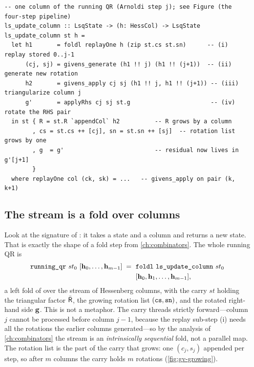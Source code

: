 \begin{lstlisting}[style=l4style]
-- one column of the running QR (Arnoldi step j); see Figure (the four-step pipeline)
ls_update_column :: LsqState -> (h: HessCol) -> LsqState
ls_update_column st h =
  let h1       = foldl replayOne h (zip st.cs st.sn)      -- (i) replay stored 0..j-1
      (cj, sj) = givens_generate (h1 !! j) (h1 !! (j+1))  -- (ii) generate new rotation
      h2       = givens_apply cj sj (h1 !! j, h1 !! (j+1)) -- (iii) triangularize column j
      g'       = applyRhs cj sj st.g                       -- (iv) rotate the RHS pair
  in st { R = st.R `appendCol` h2          -- R grows by a column
        , cs = st.cs ++ [cj], sn = st.sn ++ [sj]  -- rotation list grows by one
        , g  = g'                          -- residual now lives in g'[j+1]
        }
  where replayOne col (ck, sk) = ...   -- givens_apply on pair (k, k+1)
\end{lstlisting}

\subsection{The stream is a fold over columns}
\label{sec:gv-fold}

Look at the signature of : it takes a state and a column and
returns a new state. That is exactly the shape of a fold step from \cref{ch:combinators}.
The whole running QR is
\begin{equation}
\label{eq:gv-fold}
\begin{aligned}
  \texttt{running\_qr}\ st_0\ [\mathbf{h}_0, \dots, \mathbf{h}_{m-1}]
  \;=\;\ &\texttt{foldl}\ \texttt{ls\_update\_column}\ st_0\\
  &[\mathbf{h}_0, \mathbf{h}_1, \dots, \mathbf{h}_{m-1}],
\end{aligned}
\end{equation}
a left fold of  over the stream of Hessenberg columns, with the
carry $st$ holding the triangular factor $\bar{\mathsf{R}}$, the growing rotation list
$(\texttt{cs},\texttt{sn})$, and the rotated right-hand side $\mathbf{g}$. This is not a metaphor.
The carry threads strictly forward---column $j$ cannot be processed before column
$j{-}1$, because the replay sub-step (i) needs all the rotations the earlier columns
generated---so by the analysis of \cref{ch:combinators} the stream is an
\emph{intrinsically sequential} fold, not a parallel map. The rotation list is the part
of the carry that grows: one $(c_j,s_j)$ appended per step, so after $m$ columns the
carry holds $m$ rotations (\cref{fig:gv-growing}).

